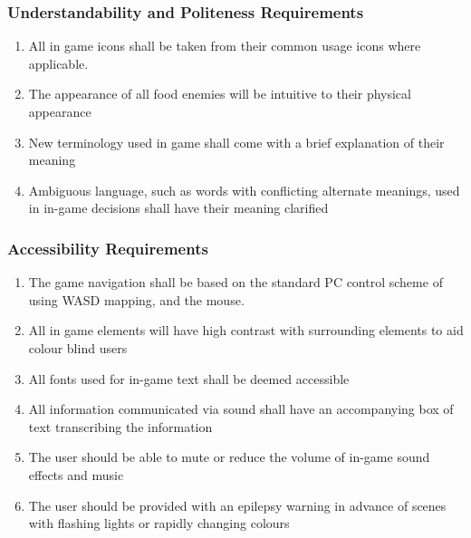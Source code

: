\documentclass[12pt, titlepage]{article}
\begin{document}
\subsubsection{Understandability and Politeness Requirements}
\label{ssub:understandability_and_politeness_requirements}
\begin{enumerate}[start=4,label={ UH\arabic*.}]
        \item All in game icons shall be taken from their common usage icons where applicable.
        \item The appearance of all food enemies will be intuitive to their physical appearance
        \item New terminology used in game shall come with a brief explanation of their meaning
        \item Ambiguous language, such as words with conflicting alternate meanings, used in in-game decisions shall have their meaning clarified

\end{enumerate}

\subsubsection{Accessibility Requirements}
\label{ssub:accessibility_requirements}
\begin{enumerate}[start=8,label={ UH\arabic*.}]
        \item The game navigation shall be based on the standard PC control scheme of using WASD mapping, and the mouse.
        \item All in game elements will have high contrast with surrounding elements to aid colour blind users
        \item All fonts used for in-game text shall be deemed accessible
        \item All information communicated via sound shall have an accompanying box of text transcribing the information
        \item The user should be able to mute or reduce the volume of in-game sound effects and music
        \item The user should be provided with an epilepsy warning in advance of scenes with flashing lights or rapidly changing colours

\end{enumerate}

\end{document}
